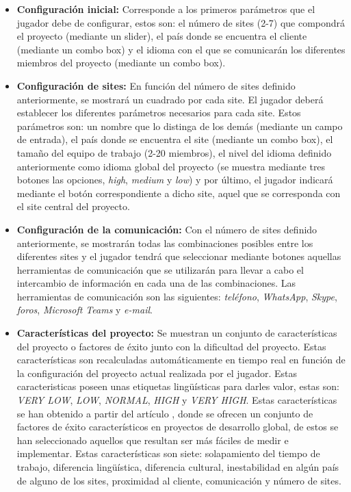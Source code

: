 \begin{itemize}
	\item \textbf{Configuración inicial:} Corresponde a los primeros parámetros que el jugador debe de configurar, estos son: el número de sites (2-7) que compondrá el proyecto (mediante un slider), el país donde se encuentra el cliente (mediante un combo box) y el idioma con el que se comunicarán los diferentes miembros del proyecto (mediante un combo box).
	\item \textbf{Configuración de sites:} En función del número de sites definido anteriormente, se mostrará un cuadrado por cada site. El jugador deberá establecer los diferentes parámetros necesarios para cada site. Estos parámetros son: un nombre que lo distinga de los demás (mediante un campo de entrada), el país donde se encuentra el site (mediante un combo box), el tamaño del equipo de trabajo (2-20 miembros), el nivel del idioma definido anteriormente como idioma global del proyecto (se muestra mediante tres botones las opciones, \emph{high}, \emph{medium} y \emph{low}) y por último, el jugador indicará mediante el botón correspondiente a dicho site, aquel que se corresponda con el site central del proyecto.
	\item \textbf{Configuración de la comunicación:} Con el número de sites definido anteriormente, se mostrarán todas las combinaciones posibles entre los diferentes sites y el jugador tendrá que seleccionar mediante botones aquellas herramientas de comunicación que se utilizarán para llevar a cabo el intercambio de información en cada una de las combinaciones. Las herramientas de comunicación son las siguientes: \emph{teléfono}, \emph{WhatsApp}, \emph{Skype}, \emph{foros}, \emph{Microsoft Teams} y \emph{e-mail}.
	\item \textbf{Características del proyecto:} Se muestran un conjunto de características del proyecto o factores de éxito junto con la dificultad del proyecto. Estas características son recalculadas automáticamente en tiempo real en función de la configuración del proyecto actual realizada por el jugador. Estas caracteristicas poseen unas etiquetas lingüísticas para darles valor, estas son: \emph{VERY LOW}, \emph{LOW}, \emph{NORMAL}, \emph{HIGH} y \emph{VERY HIGH}. Estas características se han obtenido a partir del artículo \cite{vizcaino2013applying}, donde se ofrecen un conjunto de factores de éxito característicos en proyectos de desarrollo global, de estos se han seleccionado aquellos que resultan ser más fáciles de medir e implementar. Estas características son siete: solapamiento del tiempo de trabajo, diferencia lingüística, diferencia cultural, inestabilidad en algún país de alguno de los sites, proximidad al cliente, comunicación y número de sites.

\end{itemize}
